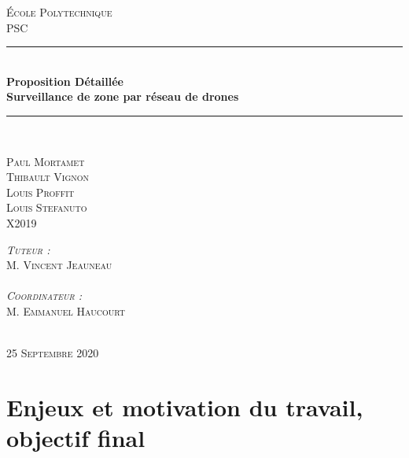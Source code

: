 \documentclass[12pt, openany]{article}
\newcommand{\HRule}{\rule{\linewidth}{0.5mm}}
\begin{document}
\begin{titlepage}
  \begin{sffamily}
  \begin{center}
    
    \textsc{\LARGE École Polytechnique} \\[0.5cm]

    \textsc{\Large PSC}\\[4cm]

    \HRule \\[0.4cm]
    { \huge \bfseries Proposition Détaillée\\[0.4cm] Surveillance de zone par réseau de drones \\[0.4cm] }

    \HRule \\[6cm]

    \begin{minipage}{0.4\textwidth}
      \begin{flushleft} \large
        \textsc{Paul Mortamet\\
        Thibault Vignon\\
        Louis Proffit\\
        Louis Stefanuto\\
        X2019\\}
      \end{flushleft}
    \end{minipage}
    \begin{minipage}{0.4\textwidth}
      \begin{flushright} \large
      \textsc{
        \emph{Tuteur :} \\
        M. Vincent Jeauneau\\
        \medbreak \\
        \emph{Coordinateur : } \\
        M. Emmanuel Haucourt \\}
      \end{flushright}
    \end{minipage} \\[1cm]
    
    \textsc{\large 25 Septembre 2020 }
    
    
  \end{center}
  \end{sffamily}
\end{titlepage}

\newpage
\section{Enjeux et motivation du travail, objectif final}
\vspace{1cm}
\end{document}
